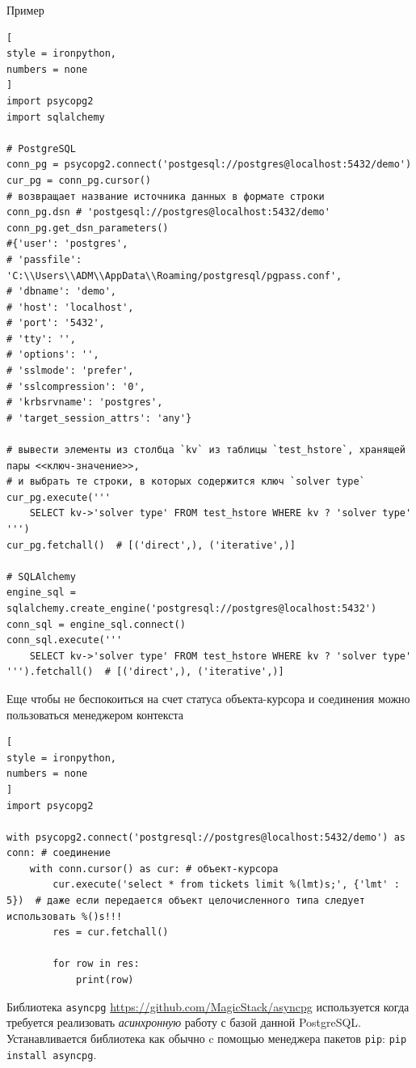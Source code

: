 \documentclass[%
	11pt,
	a4paper,
	utf8,
		]{article}
\begin{document}
Пример
\begin{lstlisting}[
style = ironpython,
numbers = none
]
import psycopg2
import sqlalchemy

# PostgreSQL
conn_pg = psycopg2.connect('postgesql://postgres@localhost:5432/demo')
cur_pg = conn_pg.cursor()
# возвращает название источника данных в формате строки
conn_pg.dsn # 'postgesql://postgres@localhost:5432/demo'
conn_pg.get_dsn_parameters()
#{'user': 'postgres',
# 'passfile': 'C:\\Users\\ADM\\AppData\\Roaming/postgresql/pgpass.conf',
# 'dbname': 'demo',
# 'host': 'localhost',
# 'port': '5432',
# 'tty': '',
# 'options': '',
# 'sslmode': 'prefer',
# 'sslcompression': '0',
# 'krbsrvname': 'postgres',
# 'target_session_attrs': 'any'}

# вывести элементы из столбца `kv` из таблицы `test_hstore`, хранящей пары <<ключ-значение>>,
# и выбрать те строки, в которых содержится ключ `solver type`
cur_pg.execute('''
    SELECT kv->'solver type' FROM test_hstore WHERE kv ? 'solver type'
''')
cur_pg.fetchall()  # [('direct',), ('iterative',)]

# SQLAlchemy
engine_sql = sqlalchemy.create_engine('postgresql://postgres@localhost:5432')
conn_sql = engine_sql.connect()
conn_sql.execute('''
    SELECT kv->'solver type' FROM test_hstore WHERE kv ? 'solver type'
''').fetchall()  # [('direct',), ('iterative',)]
\end{lstlisting}

Еще чтобы не беспокоиться на счет статуса объекта-курсора и соединения можно пользоваться менеджером контекста
\begin{lstlisting}[
style = ironpython,
numbers = none
]
import psycopg2

with psycopg2.connect('postgresql://postgres@localhost:5432/demo') as conn: # соединение
    with conn.cursor() as cur: # объект-курсора
        cur.execute('select * from tickets limit %(lmt)s;', {'lmt' : 5})  # даже если передается объект целочисленного типа следует использовать %()s!!!
        res = cur.fetchall()
        
        for row in res:
            print(row)
\end{lstlisting}

Библиотека \texttt{asyncpg} \url{https://github.com/MagicStack/asyncpg} используется когда требуется реализовать \emph{асинхронную} работу с базой данной PostgreSQL. Устанавливается библиотека как обычно c помощью менеджера пакетов \texttt{pip}: \texttt{pip install asyncpg}.
\end{document}
